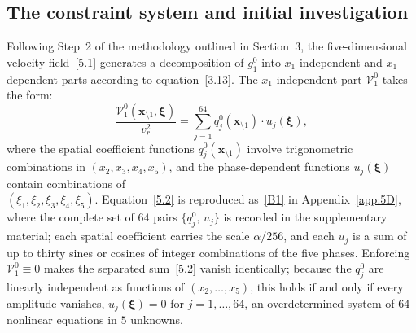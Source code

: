 \documentclass[11pt]{jfm}
\numberwithin{equation}{section}
\begin{document}
\subsection{The constraint system and initial investigation}
Following Step~2 of the methodology outlined in Section~3, the five-dimensional velocity
field~\eqref{5.1} generates a decomposition of $g_1^0$ into $x_1$-independent
and $x_1$-dependent parts according to equation~\eqref{3.13}. The $x_1$-independent
part $\mathcal{V}_1^0$ takes the form:
\begin{equation}
\label{5.2}
\frac{\mathcal{V}_1^0(\boldsymbol{x}_{\setminus 1}, \boldsymbol{\xi})}{v_r^2} = \sum_{j=1}^{64}
q_j^0(\boldsymbol{x}_{\setminus 1}) \cdot u_j(\boldsymbol{\xi}),
\end{equation}
where the spatial coefficient functions $q_j^0(\boldsymbol{x}_{\setminus 1})$ involve
trigonometric combinations in $(x_2, x_3, x_4, x_5)$, and the phase-dependent functions
$u_j(\boldsymbol{\xi})$ contain combinations of\\ $(\xi_1, \xi_2, \xi_3, \xi_4, \xi_5)$.
Equation~\eqref{5.2} is reproduced as~\eqref{B1} in Appendix~\ref{app:5D}, where the complete
set of $64$ pairs $\{q_j^0,\,u_j\}$ is recorded in the supplementary material;
each spatial coefficient carries the scale $\alpha/256$, and each $u_j$ is a sum of up to thirty sines or cosines of integer combinations of the five phases. Enforcing $\mathcal{V}_1^0 \equiv 0$ makes
the separated sum~\eqref{5.2} vanish identically; because the $q_j^0$ are linearly independent as
functions of $(x_2,\dots,x_5)$, this holds if and only if every amplitude vanishes,
$u_j(\boldsymbol{\xi}) = 0$ for $j=1,\dots,64$, an overdetermined system of $64$ nonlinear
equations in $5$ unknowns.
\end{document}
